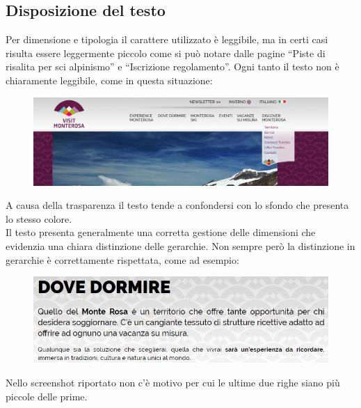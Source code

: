         \subsection{Disposizione del testo}
        Per dimensione e tipologia il carattere utilizzato è leggibile, ma in
        certi casi risulta essere leggermente piccolo come si può notare  dalle
        pagine “Piste di risalita per sci alpinismo” e “Iscrizione regolamento”.
        Ogni tanto il testo non è chiaramente leggibile, come in questa
        situazione:
        \begin{figure}[H]
            \centering
            \includegraphics[scale=0.15]{resources/images/textLayout2.png}
        \end{figure}
        A causa della trasparenza il testo tende a confondersi con lo sfondo che
        presenta lo stesso colore.\\
        Il testo presenta generalmente una corretta gestione delle dimensioni che
        evidenzia una chiara distinzione delle gerarchie. Non sempre però la 
        distinzione in gerarchie è correttamente rispettata, come ad esempio:
        \begin{figure}[H] 
            \centering
            \includegraphics[scale=0.6]{resources/images/textLayout4.jpg}
        \end{figure}
        Nello screenshot riportato non c'è motivo per cui le ultime due righe
        siano più piccole delle prime.

